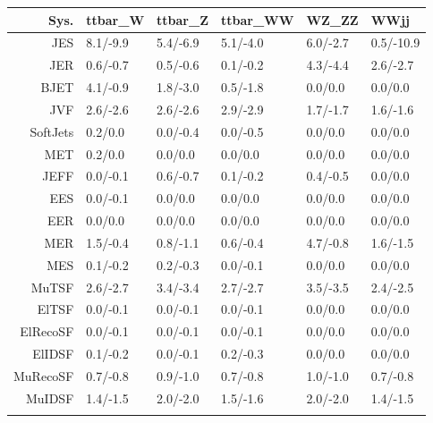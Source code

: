 \begin{tabular}{r|p{.08\linewidth}p{.08\linewidth}p{.08\linewidth}p{.08\linewidth}p{.08\linewidth}}
\toprule
 Sys.  & ttbar\_W & ttbar\_Z & ttbar\_WW & WZ\_ZZ & WWjj \\
\toprule
JES  & 8.1/-9.9 & 5.4/-6.9 & 5.1/-4.0 & 6.0/-2.7 & 0.5/-10.9 \\
JER  & 0.6/-0.7 & 0.5/-0.6 & 0.1/-0.2 & 4.3/-4.4 & 2.6/-2.7 \\
BJET  & 4.1/-0.9 & 1.8/-3.0 & 0.5/-1.8 & 0.0/0.0 & 0.0/0.0 \\
JVF  & 2.6/-2.6 & 2.6/-2.6 & 2.9/-2.9 & 1.7/-1.7 & 1.6/-1.6 \\
SoftJets  & 0.2/0.0 & 0.0/-0.4 & 0.0/-0.5 & 0.0/0.0 & 0.0/0.0 \\
MET  & 0.2/0.0 & 0.0/0.0 & 0.0/0.0 & 0.0/0.0 & 0.0/0.0 \\
JEFF  & 0.0/-0.1 & 0.6/-0.7 & 0.1/-0.2 & 0.4/-0.5 & 0.0/0.0 \\
EES  & 0.0/-0.1 & 0.0/0.0 & 0.0/0.0 & 0.0/0.0 & 0.0/0.0 \\
EER  & 0.0/0.0 & 0.0/0.0 & 0.0/0.0 & 0.0/0.0 & 0.0/0.0 \\
MER  & 1.5/-0.4 & 0.8/-1.1 & 0.6/-0.4 & 4.7/-0.8 & 1.6/-1.5 \\
MES  & 0.1/-0.2 & 0.2/-0.3 & 0.0/-0.1 & 0.0/0.0 & 0.0/0.0 \\
MuTSF  & 2.6/-2.7 & 3.4/-3.4 & 2.7/-2.7 & 3.5/-3.5 & 2.4/-2.5 \\
ElTSF  & 0.0/-0.1 & 0.0/-0.1 & 0.0/-0.1 & 0.0/0.0 & 0.0/0.0 \\
ElRecoSF  & 0.0/-0.1 & 0.0/-0.1 & 0.0/-0.1 & 0.0/0.0 & 0.0/0.0 \\
ElIDSF  & 0.1/-0.2 & 0.0/-0.1 & 0.2/-0.3 & 0.0/0.0 & 0.0/0.0 \\
MuRecoSF  & 0.7/-0.8 & 0.9/-1.0 & 0.7/-0.8 & 1.0/-1.0 & 0.7/-0.8 \\
MuIDSF  & 1.4/-1.5 & 2.0/-2.0 & 1.5/-1.6 & 2.0/-2.0 & 1.4/-1.5 \\
 \\
\bottomrule
\end{tabular}
